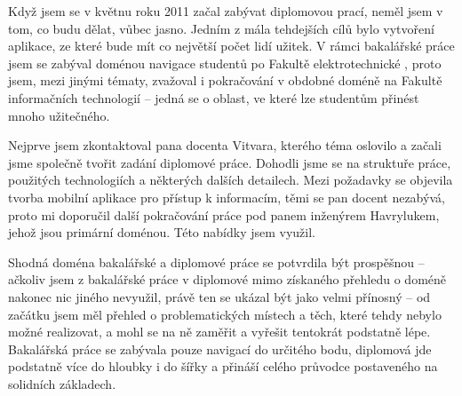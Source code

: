 Když jsem se v květnu roku 2011 začal zabývat diplomovou prací, neměl jsem v tom, co budu dělat, vůbec jasno. Jedním z mála tehdejších cílů bylo vytvoření aplikace, ze které bude mít co největší počet lidí užitek. V rámci bakalářské práce jsem se zabýval doménou navigace studentů po Fakultě elektrotechnické  \cite{Bakalarka}, proto jsem, mezi jinými tématy, zvažoval i pokračování v obdobné doméně na Fakultě informačních technologií -- jedná se o oblast, ve které lze studentům přinést mnoho užitečného.

Nejprve jsem zkontaktoval pana docenta Vitvara, kterého téma oslovilo a začali jsme společně tvořit zadání diplomové práce. Dohodli jsme se na struktuře práce, použitých technologiích a některých dalších detailech. Mezi požadavky se objevila tvorba mobilní aplikace pro přístup k informacím, těmi se pan docent nezabývá, proto mi doporučil další pokračování práce pod panem inženýrem Havrylukem, jehož jsou primární doménou. Této nabídky jsem využil.

Shodná doména bakalářské a diplomové práce se potvrdila být prospěšnou -- ačkoliv jsem z bakalářské práce v diplomové mimo získaného přehledu o doméně nakonec nic jiného nevyužil, právě ten se ukázal být jako velmi přínosný -- od začátku jsem měl přehled o problematických místech a těch, které tehdy nebylo možné realizovat, a mohl se na ně zaměřit a vyřešit tentokrát podstatně lépe. Bakalářská práce se zabývala pouze navigací do určitého bodu, diplomová jde podstatně více do hloubky i do šířky a přináší celého průvodce postaveného na solidních základech.

